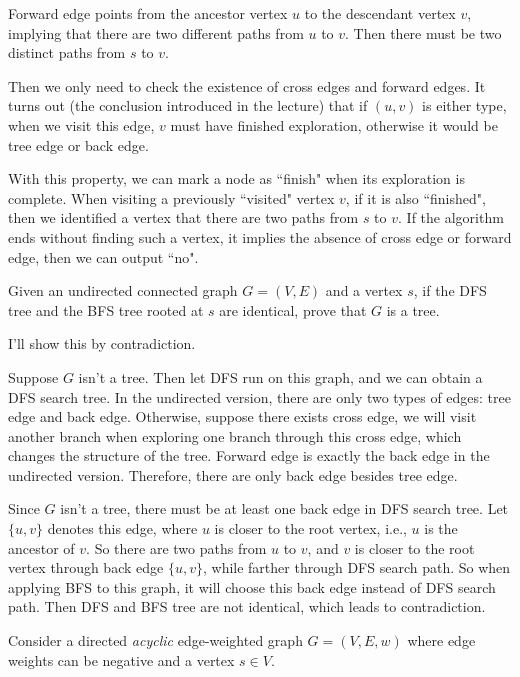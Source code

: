 \documentclass{oxmathproblems}
\begin{document}
\begin{questions}
\begin{Solution}
Forward edge points from the ancestor vertex $u$ to the descendant vertex $v$, implying that there are two different paths from $u$ to $v$. Then there must be two distinct paths from $s$ to $v$.

Then we only need to check the existence of cross edges and forward edges. It turns out (the conclusion introduced in the lecture) that if $(u, v)$ is either type, when we visit this edge, $v$ must have finished exploration, otherwise it would be tree edge or back edge. 

With this property, we can mark a node as ``finish" when its exploration is complete. When visiting a previously ``visited" vertex $v$, if it is also ``finished", then we identified a vertex that there are two paths from $s$ to $v$. If the algorithm ends without finding such a vertex, it implies the absence of cross edge or forward edge, then we can output ``no".
\end{Solution}
\vspace {2cm} 

\miquestion[25]
Given an undirected connected graph $G=(V,E)$ and a vertex $s$, if the DFS tree and the BFS tree rooted at $s$ are identical, prove that $G$ is a tree.

\begin{Solution}

I'll show this by contradiction. 

Suppose $G$ isn't a tree. Then let DFS run on this graph, and we can obtain a DFS search tree. In the undirected version, there are only two types of edges: tree edge and back edge. Otherwise, suppose there exists cross edge, we will visit another branch when exploring one branch through this cross edge, which changes the structure of the tree. Forward edge is exactly the back edge in the undirected version. Therefore, there are only back edge besides tree edge.

Since $G$ isn't a tree, there must be at least one back edge in DFS search tree. Let $\{u, v\}$ denotes this edge, where $u$ is closer to the root vertex, i.e., $u$ is the ancestor of $v$. So there are two paths from $u$ to $v$, and $v$ is closer to the root vertex through back edge $\{u, v\}$, while farther through DFS search path. So when applying BFS to this graph, it will choose this back edge instead of DFS search path. Then DFS and BFS tree are not identical, which leads to contradiction.
\end{Solution}
\newpage

\miquestion[25]
Consider a directed \emph{acyclic} edge-weighted graph $G=(V,E,w)$ where edge weights can be negative and a vertex $s\in V$. 
\begin{parts}

\end{parts}
\end{questions}
\end{document}
